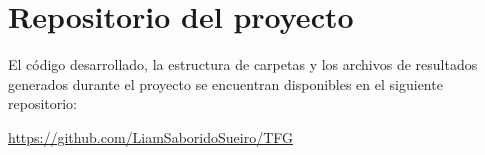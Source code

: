 \chapter{Repositorio del proyecto}
\label{anexo:repositorio}

El código desarrollado, la estructura de carpetas y los archivos de resultados generados durante el proyecto se encuentran disponibles en el siguiente repositorio:

\begin{center}
\url{https://github.com/LiamSaboridoSueiro/TFG}
\end{center}
